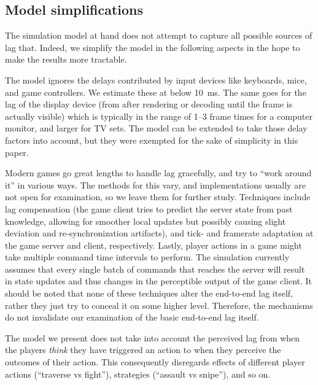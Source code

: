 \subsection{Model simplifications}

The simulation model at hand does not attempt to capture all possible 
sources of lag that. Indeed, we simplify the model in the 
following aspects in the hope to make the results more tractable.

The model ignores the delays contributed by 
input devices like keyboards, mice, and game controllers. We estimate 
these at below \SI{10}{\milli\second}. The same goes for the lag of 
the display device (from after rendering or decoding until the frame 
is actually visible) which is typically in the range of 1--3 
frame times for a computer 
monitor, and larger for TV sets. The model can be extended to take those delay factors into account, but they were exempted for the sake of simplicity in this paper.

Modern games go great lengths 
to handle lag gracefully, and try to ``work around it'' in various ways. 
The methods for this vary, and implementations usually are not open 
for examination, so we leave them for further study. 
Techniques include lag compensation (the game client 
tries to predict the server state from past knowledge, allowing for 
smoother local updates but possibly causing slight deviation and 
re-synchronization artifacts), and tick- and framerate adaptation 
at the game server and client, respectively.
Lastly, player actions in a game might take multiple command time 
intervals to perform. The simulation currently assumes that every 
single batch of commands that reaches the server will result in 
state updates and thus changes in the perceptible output of the game 
client. It should be noted that none of these techniques alter the 
end-to-end lag itself, rather they just try to conceal it on some higher level. 
Therefore, the mechanisms do not invalidate our examination of the basic 
end-to-end lag itself.

The model 
we present does not take into account the perceived lag from when the 
players \textit{think} they have triggered an action to when they 
perceive the outcomes of their action. This consequently disregards 
effects of different player actions (``traverse vs fight''), strategies 
(``assault vs snipe''), and so on.





